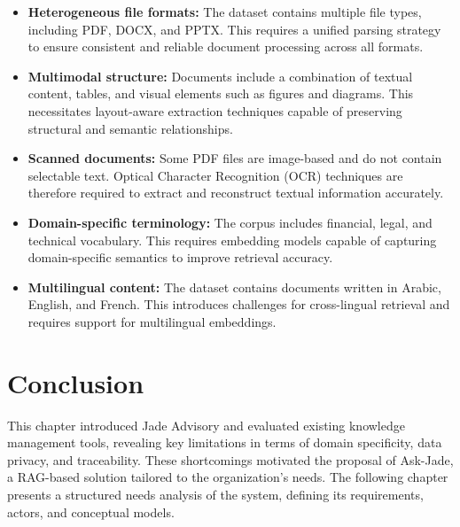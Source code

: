 \begin{itemize}
    \item \textbf{Heterogeneous file formats:}
    The dataset contains multiple file types, including PDF, DOCX, and
    PPTX. This requires a unified parsing strategy to ensure consistent
    and reliable document processing across all formats.

    \item \textbf{Multimodal structure:}
    Documents include a combination of textual content, tables, and visual
    elements such as figures and diagrams. This necessitates layout-aware
    extraction techniques capable of preserving structural and semantic
    relationships.

    \item \textbf{Scanned documents:}
    Some PDF files are image-based and do not contain selectable text.
    Optical Character Recognition (OCR) techniques are therefore required
    to extract and reconstruct textual information accurately.

    \item \textbf{Domain-specific terminology:}
    The corpus includes financial, legal, and technical vocabulary. This
    requires embedding models capable of capturing domain-specific semantics
    to improve retrieval accuracy.

    \item \textbf{Multilingual content:}
    The dataset contains documents written in Arabic, English, and French.
    This introduces challenges for cross-lingual retrieval and requires
    support for multilingual embeddings.
\end{itemize}

\section{Conclusion}
This chapter introduced Jade Advisory and evaluated existing knowledge 
management tools, revealing key limitations in terms of domain specificity, 
data privacy, and traceability. These shortcomings motivated the proposal 
of Ask-Jade, a RAG-based solution tailored to the organization's needs. 
The following chapter presents a structured needs analysis of the system, 
defining its requirements, actors, and conceptual models.
